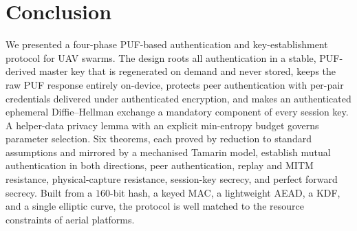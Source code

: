 \documentclass[11pt,a4paper]{article}
\theoremstyle{jrnlplain}
\theoremstyle{jrnldef}
\begin{document}
\section{Conclusion}
\label{sec:conclusion}
We presented a four-phase PUF-based authentication and key-establishment
protocol for UAV swarms. The design roots all authentication in a stable,
PUF-derived master key that is regenerated on demand and never stored, keeps
the raw PUF response entirely on-device, protects peer authentication with
per-pair credentials delivered under authenticated encryption, and makes an
authenticated ephemeral Diffie--Hellman exchange a mandatory component of every
session key. A helper-data privacy lemma with an explicit min-entropy budget
governs parameter selection. Six theorems, each proved by reduction to
standard assumptions and mirrored by a mechanised Tamarin model, establish
mutual authentication in both directions, peer authentication, replay and MITM
resistance, physical-capture resistance, session-key secrecy, and perfect
forward secrecy. Built from a $160$-bit hash, a keyed MAC, a lightweight AEAD,
a KDF, and a single elliptic curve, the protocol is well matched to the
resource constraints of aerial platforms.
\end{document}
